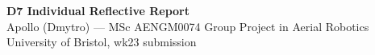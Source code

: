 \documentclass[11pt,a4paper]{article}
\begin{document}
\begin{center}
{\Large\bfseries D7 Individual Reflective Report}\\[0.2em]
{\normalsize Apollo (Dmytro) --- MSc AENGM0074 Group Project in Aerial Robotics}\\[0.2em]
{\small University of Bristol, wk23 submission}
\end{center}

\vspace{-0.5em}





\end{document}
